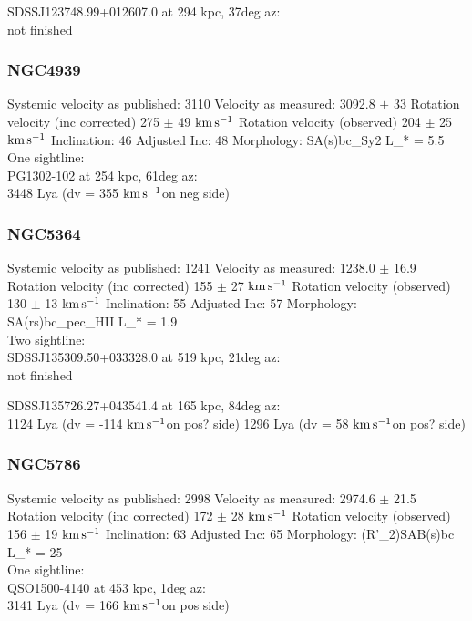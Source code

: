 \documentclass[iop]{emulateapj-rtx4}
\newcommand{\kms}{$\rm km\, s^{-1}$}
\begin{document}
SDSSJ123748.99+012607.0 at  294 kpc, 37deg az: \\
not finished


\subsubsection{NGC4939}
Systemic velocity as published: 3110
Velocity as measured: 3092.8 $\pm$ 33
Rotation velocity (inc corrected) 275 $\pm$ 49 \kms
Rotation velocity (observed) 204 $\pm$ 25 \kms
Inclination: 46
Adjusted Inc: 48
Morphology: SA(s)bc_Sy2
L_{\**} = 5.5 \\

One sightline: \\
PG1302-102 at 254 kpc, 61deg az: \\
3448 Lya (dv = 355 \kms on neg side)



\subsubsection{NGC5364}
Systemic velocity as published: 1241
Velocity as measured: 1238.0 $\pm$ 16.9
Rotation velocity (inc corrected) 155 $\pm$ 27 \kms
Rotation velocity (observed) 130 $\pm$ 13 \kms
Inclination: 55
Adjusted Inc: 57
Morphology: SA(rs)bc_pec_HII
L_{\**} = 1.9 \\

Two sightline: \\
SDSSJ135309.50+033328.0 at 519 kpc, 21deg az: \\
not finished

SDSSJ135726.27+043541.4 at 165 kpc, 84deg az: \\
1124 Lya (dv = -114 \kms on pos? side)
1296 Lya (dv = 58 \kms on pos? side)



\subsubsection{NGC5786}
Systemic velocity as published: 2998
Velocity as measured: 2974.6 $\pm$ 21.5
Rotation velocity (inc corrected) 172 $\pm$ 28 \kms
Rotation velocity (observed) 156 $\pm$ 19 \kms
Inclination: 63
Adjusted Inc: 65
Morphology: (R'_2)SAB(s)bc
L_{\**} = 25 \\

One sightline: \\
QSO1500-4140 at 453 kpc, 1deg az: \\
3141 Lya (dv = 166 \kms on pos side)
\end{document}

